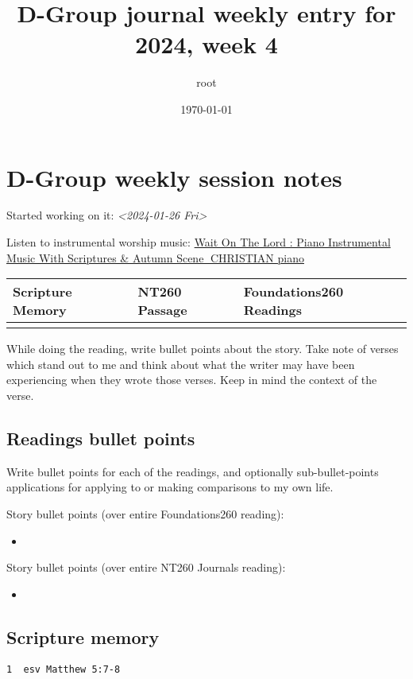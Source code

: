 \documentclass[11pt]{article}
\author{root}
\date{\today}
\title{D-Group journal weekly entry for 2024, week 4}
\begin{document}
\maketitle
\tableofcontents


\section{D-Group weekly session notes}
\label{sec:org234777c}
Started working on it: \textit{<2024-01-26 Fri>}

Listen to instrumental worship music:
\href{https://www.youtube.com/watch?v=K5qgKMWbo4c\&t=1s\&ab\_channel=CHRISTIANPiano}{Wait On The Lord : Piano Instrumental Music With Scriptures \& Autumn Scene 🍁CHRISTIAN piano}

\begin{center}
\begin{tabular}{lll}
Scripture Memory & NT260 Passage & Foundations260 Readings\\[0pt]
\hline
 &  & \\[0pt]
\end{tabular}
\end{center}

While doing the reading, write bullet points about the story.
Take note of verses which stand out to me and think about what
the writer may have been experiencing when they wrote those verses.
Keep in mind the context of the verse.

\subsection{Readings bullet points}
\label{sec:orgca40e1d}
Write bullet points for each of the readings, and optionally sub-bullet-points applications for applying to or making comparisons to my own life.

Story bullet points (over entire Foundations260 reading):
\begin{itemize}
\item 
\end{itemize}

Story bullet points (over entire NT260 Journals reading):
\begin{itemize}
\item 
\end{itemize}

\subsection{Scripture memory}
\label{sec:org3a1d98b}
\begin{verbatim}
1  esv Matthew 5:7-8
\end{verbatim}
\end{document}
